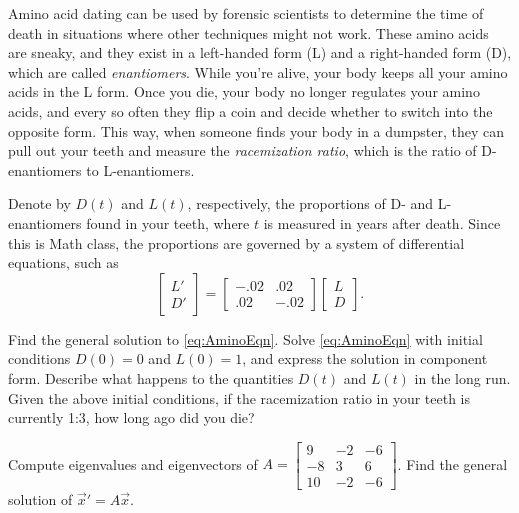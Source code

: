\begin{exercise}
Amino acid dating can be used by forensic scientists to determine the time of death in situations where other techniques might not work. These amino acids are sneaky, and they exist in a left-handed form (L) and a right-handed form (D), which are called {\it enantiomers}. While you’re alive, your body keeps all your amino acids in the L form. Once you die, your body no longer regulates your amino acids, and every so often they flip a coin and decide whether to switch into the opposite form. This way, when someone finds your body in a dumpster, they can pull out your teeth and measure the {\it racemization ratio}, which is the ratio of D-enantiomers to L-enantiomers. %

Denote by $D(t)$ and $L(t)$, respectively, the proportions of D- and L-enantiomers found in your teeth, where $t$ is measured in years after death. Since this is Math class, the proportions are governed by a system of differential equations, such as
\begin{equation}
\begin{bmatrix} L' \\ D' \end{bmatrix} = \begin{bmatrix} -.02& .02\\ .02 & -.02 \end{bmatrix}\begin{bmatrix} L\\ D \end{bmatrix}.\label{eq:AminoEqn}
\end{equation}
\begin{tasks}
\task Find the general solution to \eqref{eq:AminoEqn}.
\task Solve \eqref{eq:AminoEqn} with initial conditions $D(0) = 0$ and $L(0) = 1$, and express the solution in component form. Describe what happens to the quantities $D(t)$ and $L(t)$ in the long run.
\task Given the above initial conditions, if the racemization ratio in your teeth is currently 1:3, how long ago did you die?
\end{tasks}
\end{exercise}

\begin{exercise}
\leavevmode
\begin{tasks}
\task
Compute eigenvalues and eigenvectors of
$A = \left[ \begin{smallmatrix}
9 & -2 & -6 \\
-8 & 3 & 6 \\
10 & -2 & -6
\end{smallmatrix} \right]$.
\task
Find the general solution of ${\vec{x}}' = A \vec{x}$.
\end{tasks}
\end{exercise}

